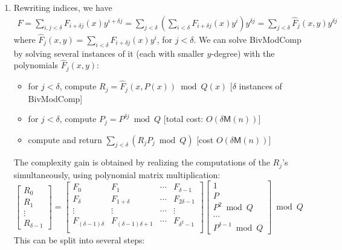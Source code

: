 \documentclass[11pt,a4paper,reqno]{amsart}
\newcommand{\bigO}[1]{O(#1)} %
\newcommand{\timepm}[1]{\mathsf{M}(#1)} %
\begin{document}
\begin{enumerate}
  \item Rewriting indices, we have
    \begin{align*}
      F = \sum_{i,j<\delta} F_{i+\delta j}(x) y^{i+\delta j} 
      = \sum_{j<\delta} \left( \sum_{i<\delta} F_{i+\delta j}(x) y^i \right) y^{\delta j}
      = \sum_{j<\delta} \hat{F}_j(x,y) y^{\delta j}
    \end{align*}
    where \(\hat{F}_j(x,y) = \sum_{i<\delta} F_{i+\delta j}(x) y^i\), for \(j <
    \delta\).  We can solve \textsf{BivModComp} by solving several instances of
    it (each with smaller \(y\)-degree) with the polynomials \(\hat{F}_j(x,y)\):
    \begin{itemize}
      \item for \(j<\delta\), compute \(R_j = \hat{F}_j(x,P(x)) \bmod Q(x)\) \hfill [\(\delta\) instances of \textsf{BivModComp}]
      \item for \(j<\delta\), compute \(P_j = P^{\delta j} \bmod Q\)  \hfill [total cost: \(\bigO{\delta \timepm{n}}\)]
      \item compute and return \(\sum_{j<\delta} (R_j P_j \bmod Q)\)  \hfill [cost \(\bigO{\delta \timepm{n}}\)]
    \end{itemize}
    The complexity gain is obtained by realizing the computations of the
    \(R_j\)'s simultaneously, using polynomial matrix multiplication:
    \[
      \begin{bmatrix}
        R_0 \\ R_1 \\ \vdots \\ R_{\delta-1}
      \end{bmatrix}
      =
      \begin{bmatrix}
        F_0 & F_1 & \cdots & F_{\delta-1} \\
        F_\delta & F_{1+\delta} & \cdots & F_{2\delta-1} \\
        \vdots & \vdots & \cdots & \vdots \\
        F_{(\delta-1)\delta} & F_{(\delta-1)\delta+1} & \cdots & F_{\delta^2-1} \\
      \end{bmatrix}
      \begin{bmatrix}
        1 \\ P \\ P^2 \bmod Q \\ \cdots \\ P^{\delta-1} \bmod Q
      \end{bmatrix}
      \bmod Q
    \]
    This can be split into several steps:

\end{enumerate}
\end{document}
